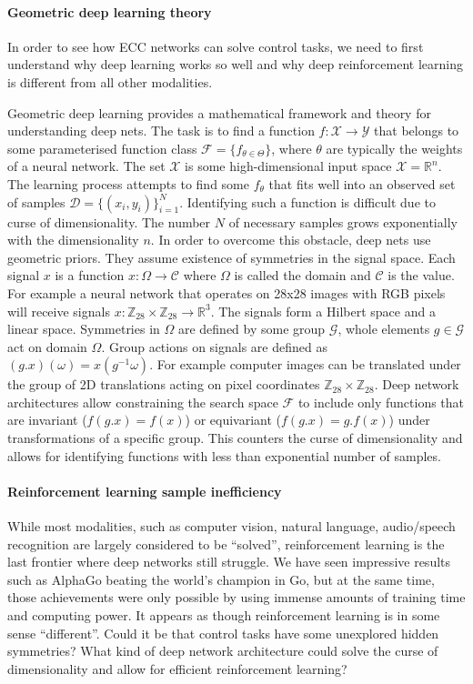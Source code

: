 \documentclass[12pt]{article}
\begin{document}
\paragraph{Geometric deep learning theory}

In order to see how ECC networks can solve control tasks, we need to first understand why deep learning works so well and why deep reinforcement learning is different from all other modalities. 

Geometric deep learning provides a mathematical framework and theory for understanding deep nets. The task is to find a function $f:\mathcal{X}\rightarrow\mathcal{Y}$ that belongs to some parameterised function class $\mathcal{F}=\{f_{\theta \in \Theta}\}$, where $\theta$ are typically the weights of a neural network. The set $\mathcal{X}$ is some high-dimensional input space $\mathcal{X}=\mathbb{R}^n$. The learning process attempts to find some $f_\theta$ that fits well into an observed set of samples $\mathcal{D}=\{(x_i,y_i)\}_{i=1}^N$. Identifying such a function is difficult due to curse of dimensionality. The number $N$ of necessary samples grows exponentially with the dimensionality $n$. In order to overcome this obstacle, deep nets use geometric priors. They assume existence of symmetries in the signal space. Each signal $x$ is a function $x:\Omega \rightarrow \mathcal{C}$ where $\Omega$ is called the domain and $\mathcal{C}$ is the value.
For example a neural network that operates on 28x28 images with RGB pixels will receive signals $x:\mathbb{Z}_{28}\times \mathbb{Z}_{28} \rightarrow \mathbb{R}^{3}$. The signals form a Hilbert space and a linear space. Symmetries in $\Omega$ are defined by some group $\mathcal{G}$, whole elements $g\in \mathcal{G}$ act on domain $\Omega$. Group actions on signals are defined as $(g.x)(\omega)=x(g^{-1}\omega)$. For example computer images can be translated under the group of 2D translations acting on pixel coordinates $\mathbb{Z}_{28}\times \mathbb{Z}_{28}$. Deep network architectures allow constraining the search space $\mathcal{F}$ to include only functions that are invariant ($f(g.x)=f(x)$) or equivariant ($f(g.x)=g.f(x)$) under transformations of a specific group. This counters the curse of dimensionality and allows for identifying functions with less than exponential number of samples.

\paragraph{Reinforcement learning sample inefficiency}
While most modalities, such as computer vision, natural language, audio/speech recognition are largely considered to be ``solved'', reinforcement learning is the last frontier where deep networks still struggle. We have seen impressive results such as AlphaGo beating the world's champion in Go, but at the same time, those achievements were only possible by using immense amounts of training time and computing power. It appears as though reinforcement learning is in some sense ``different''. Could it be that control tasks have some unexplored hidden symmetries? What kind of deep network architecture could solve the curse of dimensionality and allow for efficient reinforcement learning?
\end{document}
